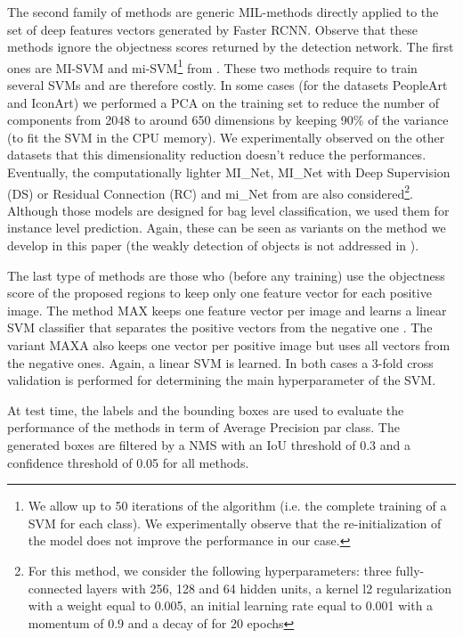 \documentclass[preprint]{elsarticle}
\newcommand\MAX{MAX}
\newcommand\MAXA{MAXA}
\begin{document}
The second family of methods are generic MIL-methods directly applied to the set of deep features vectors generated by Faster RCNN. Observe that these methods ignore the objectness scores returned by the detection network. The first ones are MI-SVM and mi-SVM\footnote{ We allow up to 50 iterations of the algorithm (i.e. the complete training of a SVM for each class). We experimentally observe that the re-initialization of the model does not improve the performance in our case.} from \citep{andrews_support_2003}. These two methods require to train several SVMs and are therefore costly. In some cases (for the datasets PeopleArt and IconArt) we performed a PCA on the training set to reduce the number of components from 2048 to around 650 dimensions by keeping 90\% of the variance (to fit the SVM in the CPU memory). We experimentally observed on the other datasets that this dimensionality reduction doesn't reduce the performances. Eventually, the computationally lighter MI\_Net, MI\_Net with Deep Supervision (DS) or Residual Connection (RC) and mi\_Net from \citep{wang_revisiting_2018} are also considered\footnote{For this method, we consider the following hyperparameters: three fully-connected layers with 256, 128 and 64 hidden units, a kernel l2 regularization with a weight equal to 0.005, an initial learning rate equal to 0.001 with a momentum of 0.9 and a decay of  for 20 epochs}. Although those models are designed for bag level classification, we used them for instance level prediction. Again, these can be seen as variants on the method we develop in this paper (the weakly detection of objects is not addressed in \citep{wang_revisiting_2018}). 

The last type of methods are those who (before any training) use the objectness score of the proposed regions to keep only one feature vector for each positive image. The method \MAX{} keeps one feature vector per image and learns a linear SVM classifier that separates the positive vectors from the negative one \citep{crowley_art_2016}. The variant \MAXA{} also keeps one vector per positive image but uses all vectors from the negative ones. Again, a linear SVM is learned. In both cases a 3-fold cross validation is performed for determining the main hyperparameter of the SVM. 





At test time, the labels and the bounding boxes are used to evaluate the performance of the methods in term of Average Precision par class. The generated boxes are filtered by a NMS with an IoU threshold of 0.3 \citep{everingham_pascal_2007} and a confidence threshold of 0.05 for all methods.
\end{document}
